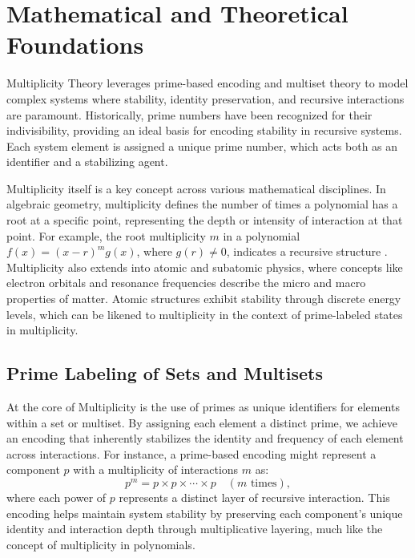 \documentclass{article}
\theoremstyle{plain}
\begin{document}
\section{Mathematical and Theoretical Foundations}
Multiplicity Theory leverages prime-based encoding and multiset theory to model complex systems where stability, identity preservation, and recursive interactions are paramount. Historically, prime numbers have been recognized for their indivisibility, providing an ideal basis for encoding stability in recursive systems. Each system element is assigned a unique prime number, which acts both as an identifier and a stabilizing agent.

Multiplicity itself is a key concept across various mathematical disciplines. In algebraic geometry, multiplicity defines the number of times a polynomial has a root at a specific point, representing the depth or intensity of interaction at that point. For example, the root multiplicity \( m \) in a polynomial \( f(x) = (x - r)^m g(x) \), where \( g(r) \neq 0 \), indicates a recursive structure \citep{birkhoff1967}. Multiplicity also extends into atomic and subatomic physics, where concepts like electron orbitals and resonance frequencies describe the micro and macro properties of matter. Atomic structures exhibit stability through discrete energy levels, which can be likened to multiplicity in the context of prime-labeled states in multiplicity.

\subsection{Prime Labeling of Sets and Multisets}

At the core of Multiplicity is the use of primes as unique identifiers for elements within a set or multiset. By assigning each element a distinct prime, we achieve an encoding that inherently stabilizes the identity and frequency of each element across interactions. 
For instance, a prime-based encoding might represent a component \( p \) with a multiplicity of interactions \( m \) as:
\begin{equation}
p^m = p \times p \times \cdots \times p \quad (m \text{ times}),
\end{equation}
where each power of \( p \) represents a distinct layer of recursive interaction. This encoding helps maintain system stability by preserving each component’s unique identity and interaction depth through multiplicative layering, much like the concept of multiplicity in polynomials.
\end{document}
